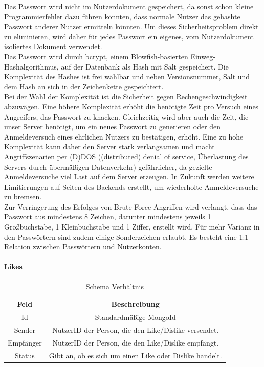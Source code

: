 Das Passwort wird nicht im Nutzerdokument gespeichert, da sonst schon kleine Programmierfehler dazu führen könnten, dass normale Nutzer das gehashte Passwort anderer Nutzer ermitteln könnten.
Um dieses Sicherheitsproblem direkt zu eliminieren, wird daher für jedes Passwort ein eigenes, vom Nutzerdokument isoliertes Dokument verwendet.\\
Das Passwort wird durch bcrypt, einem Blowfish-basierten Einweg-Hashalgorithmus, auf der Datenbank als Hash mit Salt gespeichert.
Die Komplexität des Hashes ist frei wählbar und neben Versionsnummer, Salt und dem Hash an sich in der Zeichenkette gespeichtert.\cite{db:bcrypt}\\
Bei der Wahl der Komplexität ist die Sicherheit gegen Rechengeschwindigkeit abzuwägen.
Eine höhere Komplexität erhöht die benötigte Zeit pro Versuch eines Angreifers, das Passwort zu knacken.
Gleichzeitig wird aber auch die Zeit, die unser Server benötigt, um ein neues Passwort zu generieren oder den Anmeldeversuch eines ehrlichen Nutzers zu bestätigen, erhöht.
Eine zu hohe Komplexität kann daher den Server stark verlangsamen und macht Angriffszenarien per (D)DOS ((distributed) denial of service, Überlastung des Servers durch übermäßigen Datenverkehr) gefährlicher, da gezielte Anmeldeversuche viel Last auf dem Server erzeugen.
In Zukunft werden weitere Limitierungen auf Seiten des Backends erstellt, um wiederholte Anmeldeversuche zu bremsen.\\

Zur Verringerung des Erfolges von Brute-Force-Angriffen wird verlangt, dass das Passwort aus mindestens 8 Zeichen, darunter mindestens jeweils 1 Großbuchstabe, 1 Kleinbuchstabe und 1 Ziffer, erstellt wird.
Für mehr Varianz in den Passwörtern sind zudem einige Sonderzeichen erlaubt.
Es besteht eine 1:1-Relation zwischen Passwörtern und Nutzerkonten.

\paragraph{Likes\\}
\begin{table}
    \centering
    \begin{tabular}{ |c|c| }
        \hline
        Feld & Beschreibung  \\
        \hline
        Id & Standardmäßige MongoId \\
        Sender & NutzerID der Person, die den Like/Dislike versendet. \\
        Empfänger &  NutzerID der Person, die den Like/Dislike empfängt. \\
        Status & Gibt an, ob es sich um einen Like oder Dislike handelt. \\
        \hline
    \end{tabular}
    \caption{Schema Verhältnis}
    \label{db:table:like}
\end{table}


